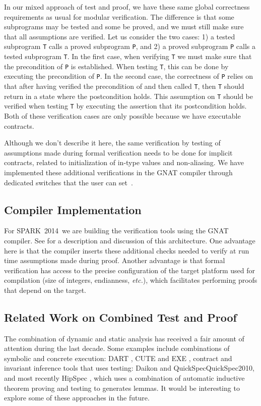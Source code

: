 \documentclass[sttt,final]{svjour}
\newcommand{\newspark}{SPARK~2014\xspace}
\newcommand{\etc}{\textit{etc.}\xspace}
\begin{document}
In our mixed approach of test and proof, we have these same global
correctness requirements as usual for modular verification. The
difference is that some subprograms may be tested and some be proved,
and we must still make sure that all assumptions are verified. Let us
consider the two cases: 1) a tested subprogram \verb|T| calls a proved
subprogram \verb|P|, and 2) a proved subprogram \verb|P| calls a
tested subprogram \verb|T|. In the first case, when verifying \verb|T|
we must make sure that the precondition of \verb|P| is
established. When testing \verb|T|, this can be done by executing the
precondition of \verb|P|. In the second case, the correctness of
\verb|P| relies on that after having verified the precondition of and
then called \verb|T|, then \verb|T| should return in a state where the
postcondition holds. This assumption on \verb|T| should be verified
when testing \verb|T| by executing the assertion that its postcondition
holds. Both of these verification cases are only possible because we
have executable contracts.

Although we don't describe it here, the same verification by testing of
assumptions made during formal verification needs to be done for implicit
contracts, related to initialization of in-type values and non-aliasing. We
have implemented these additional verifications in the GNAT compiler through
dedicated switches that the user can set~\cite{hiliteERTS2012}.

\subsection{Compiler Implementation}
For \newspark\ we are building the verification tools using the GNAT
compiler. See \cite{ksd2012} for a description and discussion of this
architecture. One advantage here is that the compiler inserts these
additional checks needed to verify at run time assumptions made during
proof. Another advantage is that formal verification has access to the
precise configuration of the target platform used for compilation
(size of integers, endianness, \etc), which facilitates performing
proofs that depend on the target.

\subsection{Related Work on Combined Test and Proof}
The combination of dynamic and static analysis has received a fair
amount of attention during the last decade. Some examples include
combinations of symbolic and concrete execution: DART \cite{DART2005},
CUTE \cite{CUTE2005} and EXE \cite{EXE2006}, contract and invariant
inference tools that uses testing: Daikon \cite{ErnstPGMPTX2007} and
QuickSpec{QuickSpec2010}, and most recently HipSpec \cite{HipSpec2012},
which uses a combination of automatic inductive theorem proving and
testing to generates lemmas. It would be interesting to explore some
of these approaches in the future.
\end{document}
